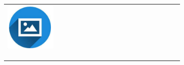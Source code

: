 \documentclass{article}
\begin{document}
\begin{paracol}{2}
 \begin{tabular}{@{}cp{0.7\linewidth}}
      \begin{minipage}{0.05\linewidth}
        \includegraphics[width=\linewidth]{picon.png}
      \end{minipage} & \vspace{-12pt}
      {\color{sidetext} {}} \\[-6pt]
      & {} \\
      & {} \\
      & {} 
    \end{tabular}


\end{paracol}
\end{document}
